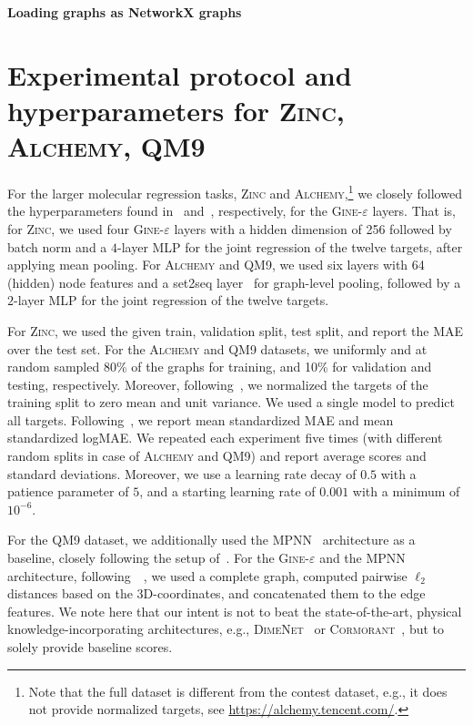 \documentclass{article}
\newcommand{\xhdr}[1]{{\noindent\bfseries #1}}
\theoremstyle{definition}
\begin{document}
\xhdr{Loading graphs as NetworkX graphs}


\section{Experimental protocol and hyperparameters for \textsc{Zinc}, \textsc{Alchemy}, \textsc{QM9}}\label{eval}
For the larger molecular regression tasks, \textsc{Zinc} and \textsc{Alchemy},\footnote{Note that the full dataset is different from the contest dataset, e.g., it does not provide normalized targets, see \url{https://alchemy.tencent.com/}.} we closely followed the hyperparameters found in~\cite{Dwi+2020} and~\cite{Che+2020}, respectively, for the \textsc{Gine-$\varepsilon$} layers. That is, for \textsc{Zinc}, we used four \textsc{Gine-$\varepsilon$} layers with a hidden dimension of 256 followed by batch norm and a $4$-layer MLP for the joint regression of the twelve targets, after applying mean pooling. For \textsc{Alchemy} and \textsc{QM9}, we used six layers with 64 (hidden) node features and a set2seq layer~\cite{Vin+2016} for graph-level pooling, followed by a $2$-layer MLP for the joint regression of the twelve targets.

For \textsc{Zinc}, we used the given train, validation split, test split, and report the MAE over the test set. For the \textsc{Alchemy} and \textsc{QM9} datasets, we uniformly and at random sampled 80\% of the graphs for training, and 10\% for validation and testing, respectively. Moreover, following~\cite{Che+2020,Gil+2017}, we normalized the targets of the training split to zero mean and unit variance. We used a single model to predict all targets. Following~\cite{Kli+2020}, we report mean standardized MAE and mean standardized logMAE. We repeated each experiment five times (with different random splits in case of \textsc{Alchemy} and \textsc{QM9}) and report average scores and standard deviations.  Moreover, we use a learning rate decay of $0.5$ with a patience parameter of $5$, and a starting learning rate of $0.001$ with a minimum of $10^{-6}$.

For the \textsc{QM9} dataset, we additionally used the \textsc{MPNN}~\cite{Gil+2017} architecture as a baseline, closely following the setup of~\cite{Gil+2017}. For the \textsc{Gine-$\varepsilon$}  and the \textsc{MPNN} architecture, following~\citeauthor{Gil+2017}~\cite{Gil+2017}, we used a complete graph, computed pairwise $\ell_2$ distances based on the 3D-coordinates, and concatenated them to the edge features. We note here that our intent is not to beat the state-of-the-art, physical knowledge-incorporating architectures, e.g., \textsc{DimeNet}~\cite{Kli+2020} or \textsc{Cormorant}~\cite{And+2019}, but to solely provide baseline scores. 
\end{document}
